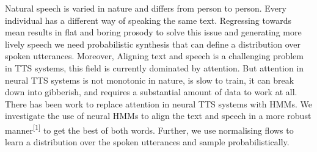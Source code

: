 \large
Natural speech is varied in nature and differs from person to person. Every individual has a different way of speaking the same text. Regressing towards mean results in flat and boring prosody to solve this issue and generating more lively speech we need probabilistic synthesis that can define a distribution over spoken utterances. Moreover, Aligning text and speech is a challenging problem in TTS systems, this field is currently dominated by attention. But attention in neural TTS systems is not monotonic in nature, is slow to train, it can break down into gibberish, and requires a substantial amount of data to work at all. There has been work to replace attention in neural TTS systems with HMMs. We investigate the use of neural HMMs to align the text and speech in a more robust manner\textsuperscript{[1]}
 to get the best of both words. Further, we use normalising flows to learn a distribution over the spoken utterances and sample probabilistically.
